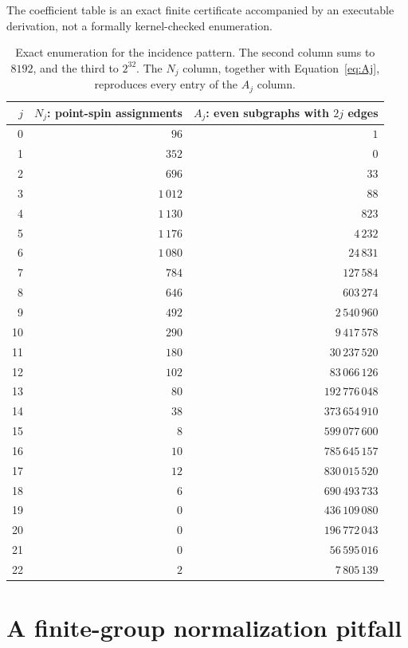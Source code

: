 \documentclass[11pt]{article}
\numberwithin{equation}{section}
\theoremstyle{definition}
\theoremstyle{remark}
\begin{document}
The coefficient table is an exact finite certificate accompanied by an
executable derivation, not a formally kernel-checked enumeration.
\begin{table}[p]
\centering
\begin{tabular}{rrr}
\toprule
$j$ & $N_j$: point-spin assignments & $A_j$: even subgraphs with $2j$ edges\\
\midrule
0 & $96$ & $1$ \\
1 & $352$ & $0$ \\
2 & $696$ & $33$ \\
3 & $1\,012$ & $88$ \\
4 & $1\,130$ & $823$ \\
5 & $1\,176$ & $4\,232$ \\
6 & $1\,080$ & $24\,831$ \\
7 & $784$ & $127\,584$ \\
8 & $646$ & $603\,274$ \\
9 & $492$ & $2\,540\,960$ \\
10 & $290$ & $9\,417\,578$ \\
11 & $180$ & $30\,237\,520$ \\
12 & $102$ & $83\,066\,126$ \\
13 & $80$ & $192\,776\,048$ \\
14 & $38$ & $373\,654\,910$ \\
15 & $8$ & $599\,077\,600$ \\
16 & $10$ & $785\,645\,157$ \\
17 & $12$ & $830\,015\,520$ \\
18 & $6$ & $690\,493\,733$ \\
19 & $0$ & $436\,109\,080$ \\
20 & $0$ & $196\,772\,043$ \\
21 & $0$ & $56\,595\,016$ \\
22 & $2$ & $7\,805\,139$ \\
\bottomrule
\end{tabular}
\caption{Exact enumeration for the incidence pattern. The second column
sums to $8192$, and the third to $2^{32}$. The $N_j$ column, together
with Equation~\eqref{eq:Aj}, reproduces every entry of the $A_j$ column.}
\label{tab:poly}
\end{table}

\clearpage

\section{A finite-group normalization pitfall}
\label{app:normalization}
\end{document}
